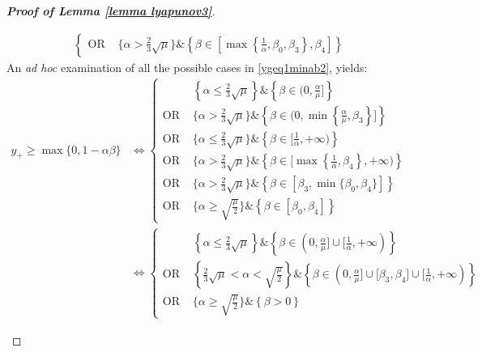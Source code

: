 \documentclass[reqno]{amsart}
\theoremstyle{plain}
\theoremstyle{definition}
\theoremstyle{remark}
\begin{document}
\begin{proof}[\textbf{Proof of Lemma \ref{lemma lyapunov3}}]
\begin{itemize}[wide=0pt]
\begin{itemize}[wide=5pt]
\begin{equation}
\begin{aligned}
\begin{cases}
						\text{OR } &
						\{\alpha > \frac{2}{3}\sqrt{\mu}\}\&\left\{\beta\in [\max\left\{\frac{1}{\alpha},\beta_{0},\beta_{3}\right\},\beta_{4}]\right\} 
					\end{cases}
				\end{aligned}
			\end{equation}
			An \textit{ad hoc} examination of all the possible cases in \eqref{ygeq1minab2}, yields:
			\begin{equation}\label{ygeq1minab3}
				\begin{aligned}
					y_{+}\geq \max\{0,1-\alpha\beta\} &\Leftrightarrow\begin{cases}
						& \left\{\alpha\leq \frac{2}{3}\sqrt{\mu}\right\}\&\left\{\beta \in (0,\frac{\alpha}{\mu}\big]\right\} \\
						\text{OR } &
						\{\alpha > \frac{2}{3}\sqrt{\mu}\} \& \left\{\beta\in (0,\min\left\{ \frac{\alpha}{\mu},\beta_{3}\right\}\big]\right\}   \\
						\text{OR } &
						\{\alpha \leq \frac{2}{3}\sqrt{\mu}\}\&\left\{\beta \in  \big[\frac{1}{\alpha},+\infty) \right\}     \\
						\text{OR } &
						\{\alpha > \frac{2}{3}\sqrt{\mu}\} \& \left\{\beta\in \big[\max\left\{\frac{1}{\alpha},\beta_{4}\right\},+\infty)\right\}   \\
						\text{OR } &
						\{\alpha > \frac{2}{3}\sqrt{\mu}\}\&\left\{\beta\in [\beta_{3},\min\{\beta_{0},\beta_{4}\}]\right\}   \\
						\text{OR } &
						\{\alpha \geq \sqrt{\frac{\mu}{2}}\}\&\left\{\beta\in [\beta_{0},\beta_{4}]\right\} 
					\end{cases} \\
					& \Leftrightarrow\begin{cases}
						& \left\{\alpha\leq \frac{2}{3}\sqrt{\mu}\right\}\&\left\{\beta \in (0,\frac{\alpha}{\mu}\big]\cup\big[\frac{1}{\alpha},+\infty)\right\} \\
						\text{OR } &
						\left\{ \frac{2}{3}\sqrt{\mu} < \alpha <\sqrt{\frac{\mu}{2}}\right\} \& \left\{\beta\in (0, \frac{\alpha}{\mu}\big]\cup\big[\beta_{3},\beta_{4}\big]\cup\big[\frac{1}{\alpha},+\infty) \right\} \\
						\text{OR } &
						\{\alpha \geq \sqrt{\frac{\mu}{2}}\}\&\left\{\beta>0\right\} 
					\end{cases}
				\end{aligned}
			\end{equation}
			

\end{itemize}
\end{itemize}
\end{proof}
\end{document}
